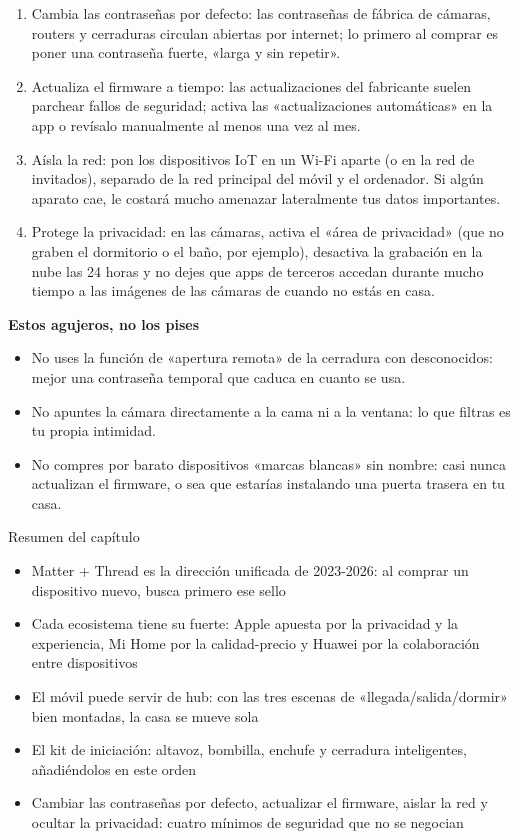 \begin{enumerate}
  \item Cambia las contraseñas por defecto: las contraseñas de fábrica de cámaras, routers y cerraduras circulan abiertas por internet; lo primero al comprar es poner una contraseña fuerte, «larga y sin repetir».
  \item Actualiza el firmware a tiempo: las actualizaciones del fabricante suelen parchear fallos de seguridad; activa las «actualizaciones automáticas» en la app o revísalo manualmente al menos una vez al mes.
  \item Aísla la red: pon los dispositivos IoT en un Wi-Fi aparte (o en la red de invitados), separado de la red principal del móvil y el ordenador. Si algún aparato cae, le costará mucho amenazar lateralmente tus datos importantes.
  \item Protege la privacidad: en las cámaras, activa el «área de privacidad» (que no graben el dormitorio o el baño, por ejemplo), desactiva la grabación en la nube las 24 horas y no dejes que apps de terceros accedan durante mucho tiempo a las imágenes de las cámaras de cuando no estás en casa.
\end{enumerate}

\textbf{Estos agujeros, no los pises}\par

\begin{itemize}
  \item No uses la función de «apertura remota» de la cerradura con desconocidos: mejor una contraseña temporal que caduca en cuanto se usa.
  \item No apuntes la cámara directamente a la cama ni a la ventana: lo que filtras es tu propia intimidad.
  \item No compres por barato dispositivos «marcas blancas» sin nombre: casi nunca actualizan el firmware, o sea que estarías instalando una puerta trasera en tu casa.
\end{itemize}

\begin{tcbsummary}{Resumen del capítulo}
\begin{itemize}
  \item Matter + Thread es la dirección unificada de 2023-2026: al comprar un dispositivo nuevo, busca primero ese sello
  \item Cada ecosistema tiene su fuerte: Apple apuesta por la privacidad y la experiencia, Mi Home por la calidad-precio y Huawei por la colaboración entre dispositivos
  \item El móvil puede servir de hub: con las tres escenas de «llegada/salida/dormir» bien montadas, la casa se mueve sola
  \item El kit de iniciación: altavoz, bombilla, enchufe y cerradura inteligentes, añadiéndolos en este orden
  \item Cambiar las contraseñas por defecto, actualizar el firmware, aislar la red y ocultar la privacidad: cuatro mínimos de seguridad que no se negocian
\end{itemize}

\end{tcbsummary}
